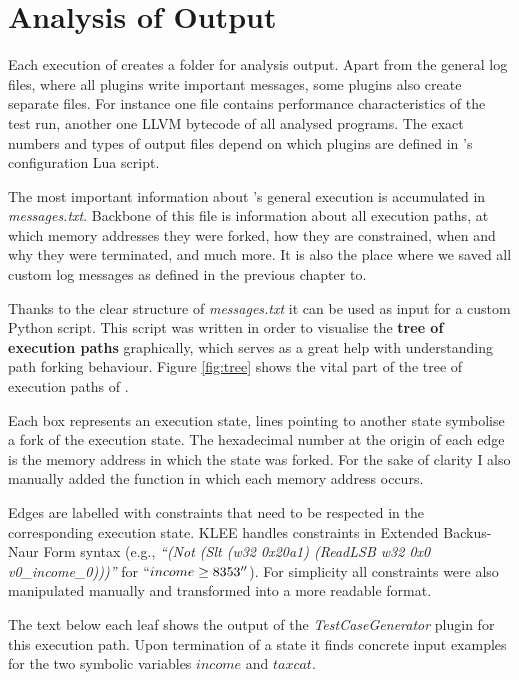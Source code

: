 \section{Analysis of \sse Output}\label{sec:ana}

Each execution of \sse creates a folder for analysis output.
Apart from the general log files, where all plugins write important messages, some plugins also create separate files.
For instance one file contains performance characteristics of the test run, another one LLVM bytecode of all analysed programs.
The exact numbers and types of output files depend on which plugins are defined in \sse's configuration Lua script.

The most important information about \sse's general execution is accumulated in \textit{messages.txt}.
Backbone of this file is information about all execution paths, at which memory addresses they were forked, how they are constrained, when and why they were terminated, and much more.
It is also the place where we saved all custom log messages as defined in the previous chapter to.

\medskip

Thanks to the clear structure of \textit{messages.txt} it can be used as input for a custom Python script. This script was written in order to visualise the \textbf{tree of execution paths} graphically, which serves as a great help with understanding path forking behaviour.
Figure \ref{fig:tree} shows the vital part of the tree of execution paths of \app.

Each box represents an execution state, lines pointing to another state symbolise a fork of the execution state.
The hexadecimal number at the origin of each edge is the memory address in which the state was forked.
For the sake of clarity I also manually added the function in which each memory address occurs.

Edges are labelled with constraints that need to be respected in the corresponding execution state.
KLEE handles constraints in Extended Backus-Naur Form syntax (e.g., \textit{``(Not (Slt (w32 0x20a1) (ReadLSB w32 0x0 v0\_income\_0)))''} for $``income \ge 8353''$).
For simplicity all constraints were also manipulated manually and transformed into a more readable format.

The text below each leaf shows the output of the \textit{TestCaseGenerator} plugin for this execution path.
Upon termination of a state it finds concrete input examples for the two symbolic variables $income$ and $taxcat$.


